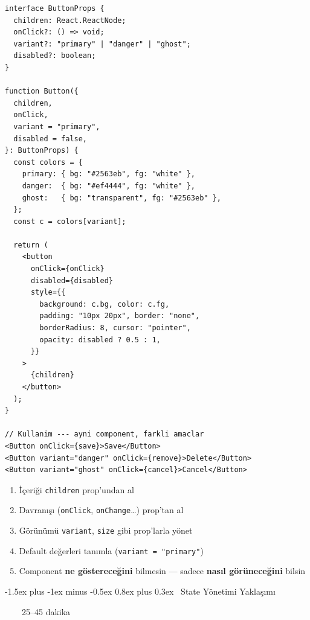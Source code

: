 \documentclass[12pt, a4paper]{article}
\makeatletter
\renewcommand{\section}{%
  \@startsection{section}{1}{\z@}%
    {-1.5ex plus -1ex minus -0.5ex}%
    {0.8ex plus 0.3ex}%
    {\normalfont\Large\bfseries\sffamily\color{primary}}%
}
\newcommand{\timebadge}[1]{%
  \noindent
  \colorbox{primary}{\color{white}\sffamily\bfseries\small\strut~~\faStopwatch~~#1~~}%
  \par\vspace{4pt}%
}
\makeatother
\begin{document}
\begin{tcolorbox}[enhanced, colback=codebg, colframe=gray!30,
    colbacktitle=accent!85!black, coltitle=white, arc=4pt,
    title={\sffamily\bfseries\small \faCheck\ Reusable Button}]
\begin{lstlisting}[style=jsxstyle]
interface ButtonProps {
  children: React.ReactNode;
  onClick?: () => void;
  variant?: "primary" | "danger" | "ghost";
  disabled?: boolean;
}

function Button({
  children,
  onClick,
  variant = "primary",
  disabled = false,
}: ButtonProps) {
  const colors = {
    primary: { bg: "#2563eb", fg: "white" },
    danger:  { bg: "#ef4444", fg: "white" },
    ghost:   { bg: "transparent", fg: "#2563eb" },
  };
  const c = colors[variant];

  return (
    <button
      onClick={onClick}
      disabled={disabled}
      style={{
        background: c.bg, color: c.fg,
        padding: "10px 20px", border: "none",
        borderRadius: 8, cursor: "pointer",
        opacity: disabled ? 0.5 : 1,
      }}
    >
      {children}
    </button>
  );
}

// Kullanim --- ayni component, farkli amaclar
<Button onClick={save}>Save</Button>
<Button variant="danger" onClick={remove}>Delete</Button>
<Button variant="ghost" onClick={cancel}>Cancel</Button>
\end{lstlisting}
\end{tcolorbox}

\vspace{6pt}

\begin{infobox}
\begin{enumerate}
  \item İçeriği \texttt{children} prop'undan al
  \item Davranışı (\texttt{onClick}, \texttt{onChange}\ldots) prop'tan al
  \item Görünümü \texttt{variant}, \texttt{size} gibi prop'larla yönet
  \item Default değerleri tanımla (\texttt{variant = "primary"})
  \item Component \textbf{ne göstereceğini} bilmesin --- sadece \textbf{nasıl
        görüneceğini} bilsin
\end{enumerate}
\end{infobox}

\newpage
\section{\faProjectDiagram\ State Yönetimi Yaklaşımı}
\timebadge{25--45 dakika}
\end{document}
